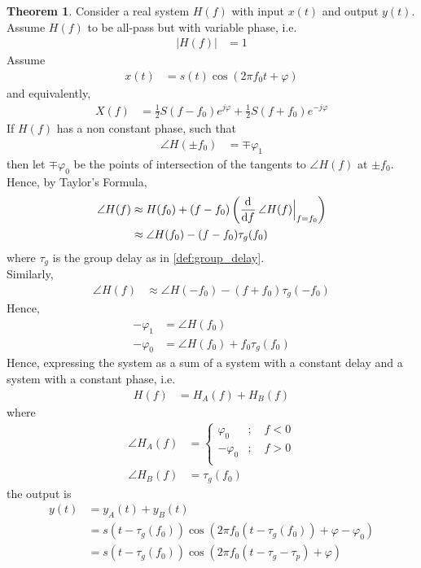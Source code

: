 \documentclass[titlepage, fleqn, a4paper, 12pt, twoside]{article}
\theoremstyle{definition}
\theoremstyle{theorem}
\newtheorem{theorem}{Theorem}
\begin{document}
\begin{theorem}
	Consider a real system $H(f)$ with input $x(t)$ and output $y(t)$.
	Assume $H(f)$ to be all-pass but with variable phase, i.e.
	\begin{align*}
		\left| H(f) \right| &= 1
	\end{align*}
	Assume
	\begin{align*}
		x(t) &= s(t) \cos\left( 2 \pi f_0 t + \varphi \right)
	\end{align*}
	and equivalently,
	\begin{align*}
		X(f) &= \frac{1}{2} S(f - f_0) e^{j \varphi} + \frac{1}{2} S(f + f_0) e^{-j \varphi}
	\end{align*}
	If $H(f)$ has a non constant phase, such that
	\begin{align*}
		\angle H(\pm f_0) &= \mp \varphi_1
	\end{align*}
	then let $\mp \varphi_0$ be the points of intersection of the tangents to $\angle H(f)$ at $\pm f_0$.\\
	Hence, by Taylor's Formula,
	\begin{align*}
		\angle H(f) &\approx H(f_0) + (f - f_0) \left( \dod{}{f} \angle H(f) \Big|_{f = f_0} \right)\\
		&\approx \angle H(f_0) - (f - f_0) \tau_g(f_0)
	\end{align*}
	where $\tau_g$ is the group delay as in \cref{def:group_delay}.\\
	Similarly,
	\begin{align*}
		\angle H(f) &\approx \angle H(-f_0) - (f + f_0) \tau_g(-f_0)
	\end{align*}
	Hence,
	\begin{align*}
		-\varphi_1 &= \angle H(f_0)\\
		-\varphi_0 &= \angle H(f_0) + f_0 \tau_g(f_0)
	\end{align*}
	Hence, expressing the system as a sum of a system with a constant delay and a system with a constant phase, i.e.
	\begin{align*}
		H(f) &= H_A(f) + H_B(f)
	\end{align*}
	where
	\begin{align*}
		\angle H_A(f) &=
			\begin{cases}
				\varphi_0 &;\quad f < 0\\
				-\varphi_0 &;\quad f > 0\\
			\end{cases}\\
		\angle H_B(f) &= \tau_g(f_0)
	\end{align*}
	the output is
	\begin{align*}
		y(t) &= y_A(t) + y_B(t)\\
		&= s\left( t - \tau_g(f_0) \right) \cos\left( 2 \pi f_0 \left( t - \tau_g(f_0) \right) + \varphi - \varphi_0 \right)\\
		&= s\left( t - \tau_g(f_0) \right) \cos\left( 2 \pi f_0 (t - \tau_g - \tau_p) + \varphi \right)
	\end{align*}
\end{theorem}
\end{document}
